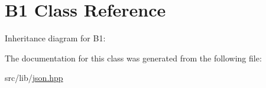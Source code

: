 \hypertarget{class_b1}{}\section{B1 Class Reference}
\label{class_b1}


Inheritance diagram for B1\+:


The documentation for this class was generated from the following file\+:\begin{DoxyCompactItemize}
\item 
src/lib/\hyperlink{json_8hpp}{json.\+hpp}\end{DoxyCompactItemize}
